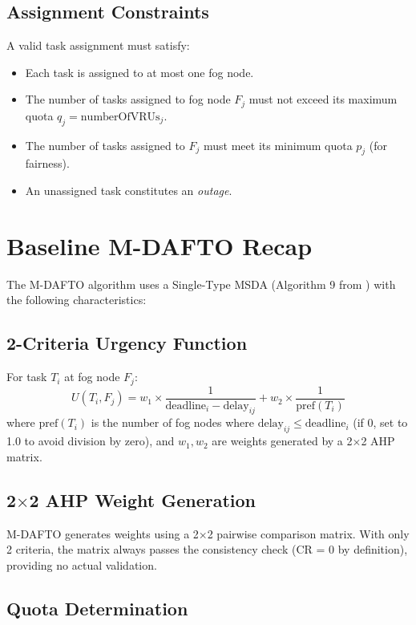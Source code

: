\subsection{Assignment Constraints}

A valid task assignment must satisfy:
\begin{itemize}
\item Each task is assigned to at most one fog node.
\item The number of tasks assigned to fog node $F_j$ must not exceed its maximum quota $q_j = \text{numberOfVRUs}_j$.
\item The number of tasks assigned to $F_j$ must meet its minimum quota $p_j$ (for fairness).
\item An unassigned task constitutes an \textit{outage}.
\end{itemize}

\section{Baseline M-DAFTO Recap}

The M-DAFTO algorithm \cite{swain2024mdafto} uses a Single-Type MSDA (Algorithm 9 from \cite{fragiadakis2016strategyproof}) with the following characteristics:

\subsection{2-Criteria Urgency Function}

For task $T_i$ at fog node $F_j$:
\begin{equation}
U(T_i, F_j) = w_1 \times \frac{1}{\text{deadline}_i - \text{delay}_{ij}} + w_2 \times \frac{1}{\text{pref}(T_i)}
\end{equation}
where $\text{pref}(T_i)$ is the number of fog nodes where $\text{delay}_{ij} \leq \text{deadline}_i$ (if 0, set to 1.0 to avoid division by zero), and $w_1, w_2$ are weights generated by a 2$\times$2 AHP matrix.

\subsection{2$\times$2 AHP Weight Generation}

M-DAFTO generates weights using a 2$\times$2 pairwise comparison matrix. With only 2 criteria, the matrix always passes the consistency check (CR = 0 by definition), providing no actual validation.

\subsection{Quota Determination}

